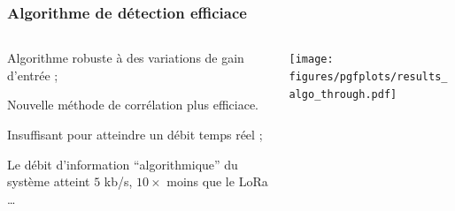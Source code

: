 \documentclass[../main.tex]{subfiles}
\begin{document}
\begin{frame}
  \frametitle{Algorithme de détection efficiace}
  \begin{columns}
    \begin{column}{.4\linewidth}
      \begin{ctrlitemize}{.5 em}
        \item Algorithme robuste à des variations de gain d'entrée ;
        \item Nouvelle méthode de corrélation plus efficiace\footnotemark.
      \end{ctrlitemize} \vspace{1.5 em}

      \begin{ctrlitemize}{.5 em}
        \item Insuffisant pour atteindre un débit temps réel ;
        \item Le débit d'information ``algorithmique'' du système atteint $5$ kb/s, $10\times$ moins que le LoRa \dots
      \end{ctrlitemize}
    \end{column}
    \begin{column}{.4\linewidth}
      \centering
      \texttt{[image: figures/pgfplots/results\_algo\_through.pdf]}
    \end{column}
  \end{columns}
\end{frame}
\end{document}
